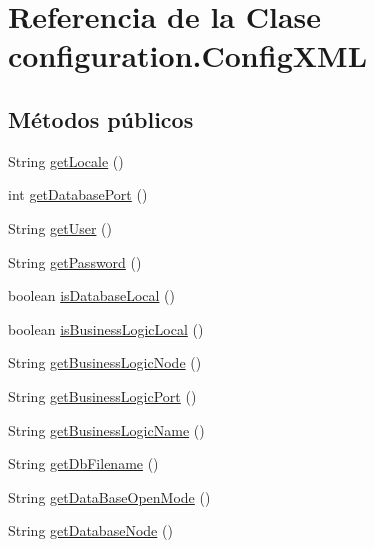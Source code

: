 \hypertarget{classconfiguration_1_1_config_x_m_l}{}\section{Referencia de la Clase configuration.\+Config\+X\+ML}
\label{classconfiguration_1_1_config_x_m_l}
\subsection*{Métodos públicos}
\begin{DoxyCompactItemize}
\item 
String \mbox{\hyperlink{classconfiguration_1_1_config_x_m_l_a6b861b18eba822ef3a5130a1c3f410b2}{get\+Locale}} ()
\item 
int \mbox{\hyperlink{classconfiguration_1_1_config_x_m_l_abf4649caafdcfb0b506af7402f09728c}{get\+Database\+Port}} ()
\item 
String \mbox{\hyperlink{classconfiguration_1_1_config_x_m_l_a98e53bd841ca5f520af914f96ff2afef}{get\+User}} ()
\item 
String \mbox{\hyperlink{classconfiguration_1_1_config_x_m_l_a70146fb5f8cda65220413959691e3616}{get\+Password}} ()
\item 
boolean \mbox{\hyperlink{classconfiguration_1_1_config_x_m_l_a2ee9afbde36aa3f5c0d0158a8b5449fb}{is\+Database\+Local}} ()
\item 
boolean \mbox{\hyperlink{classconfiguration_1_1_config_x_m_l_a3055cd4f61151ef6d1c48a5ebf86b33f}{is\+Business\+Logic\+Local}} ()
\item 
String \mbox{\hyperlink{classconfiguration_1_1_config_x_m_l_a6a79b28dd9e0c1c755fef0e7435ec03a}{get\+Business\+Logic\+Node}} ()
\item 
String \mbox{\hyperlink{classconfiguration_1_1_config_x_m_l_a7e8cb431bc1e899176ae2891c007f7f3}{get\+Business\+Logic\+Port}} ()
\item 
String \mbox{\hyperlink{classconfiguration_1_1_config_x_m_l_ad6866b6aee38c74c082135f5dcd743ad}{get\+Business\+Logic\+Name}} ()
\item 
String \mbox{\hyperlink{classconfiguration_1_1_config_x_m_l_a403cc4242d937a87dfea24caabaf535d}{get\+Db\+Filename}} ()
\item 
String \mbox{\hyperlink{classconfiguration_1_1_config_x_m_l_a693787d7818204c9188cb0c03d9423a0}{get\+Data\+Base\+Open\+Mode}} ()
\item 
String \mbox{\hyperlink{classconfiguration_1_1_config_x_m_l_a622fdcb9a55b406b6bc2fa63509dae72}{get\+Database\+Node}} ()
\end{DoxyCompactItemize}
